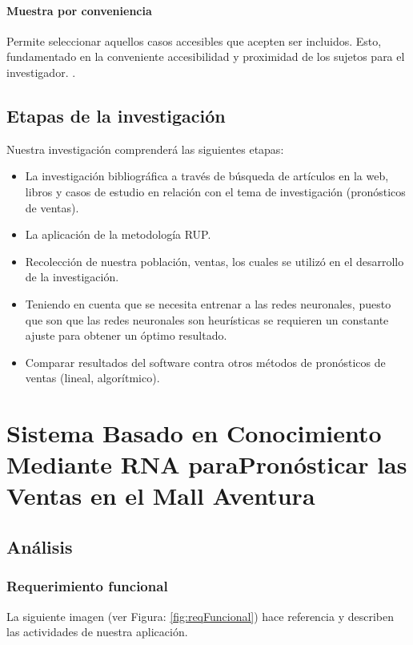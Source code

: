 \subsubsection{Muestra por conveniencia}
Permite seleccionar aquellos casos accesibles que acepten ser incluidos. Esto, fundamentado en la conveniente accesibilidad y proximidad de los sujetos para el investigador. \citep{otzen2017tecnicas}.

\section{Etapas de la investigación}
Nuestra investigación comprenderá  las siguientes etapas:
\begin{itemize}
\item La investigación bibliográfica a través de búsqueda de artículos en la web, libros y casos de estudio en relación con el tema de investigación (pronósticos de ventas).
\item La aplicación de la metodología RUP.
\item Recolección de nuestra población, ventas, los cuales se utilizó en el desarrollo de la investigación.
\item Teniendo en cuenta que se necesita entrenar a las redes neuronales, puesto que son  que las redes neuronales son heurísticas se requieren un constante ajuste para obtener un óptimo resultado.
\item Comparar resultados del software contra otros métodos de pronósticos de ventas (lineal, algorítmico).

\end{itemize}

\chapter{Sistema Basado en Conocimiento Mediante RNA paraPronósticar las Ventas en el Mall Aventura}
\renewcommand{\baselinestretch}{2} %

\section{Análisis}

\subsection{Requerimiento funcional}
La siguiente imagen (ver Figura: \ref{fig:reqFuncional}) hace referencia y describen las actividades de nuestra aplicación.

